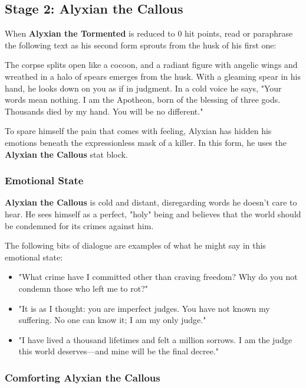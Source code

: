 \documentclass[letterpaper, 11pt, bg=full, twocolumn]{dndbook}
\begin{document}
\subsection{Stage 2: Alyxian the Callous}

When \textbf{Alyxian the Tormented} is reduced to 0 hit points, read or paraphrase the following text as his second form sprouts from the husk of his first one:

\begin{DndReadAloud}
The corpse splits open like a cocoon, and a radiant figure with angelic wings and wreathed in a halo of spears emerges from the husk. With a gleaming spear in his hand, he looks down on you as if in judgment. In a cold voice he says, "Your words mean nothing. I am the Apotheon, born of the blessing of three gods. Thousands died by my hand. You will be no different."
\end{DndReadAloud}

To spare himself the pain that comes with feeling, Alyxian has hidden his emotions beneath the expressionless mask of a killer. In this form, he uses the \textbf{Alyxian the Callous} stat block.


\subsubsection{Emotional State}

\textbf{Alyxian the Callous} is cold and distant, disregarding words he doesn't care to hear. He sees himself as a perfect, "holy" being and believes that the world should be condemned for its crimes against him.

The following bits of dialogue are examples of what he might say in this emotional state:

\begin{itemize}
\item "What crime have I committed other than craving freedom? Why do you not condemn those who left me to rot?"
\item "It is as I thought: you are imperfect judges. You have not known my suffering. No one can know it; I am my only judge."
\item "I have lived a thousand lifetimes and felt a million sorrows. I am the judge this world deserves---and mine will be the final decree."
\end{itemize}

\subsubsection{Comforting Alyxian the Callous}
\end{document}
